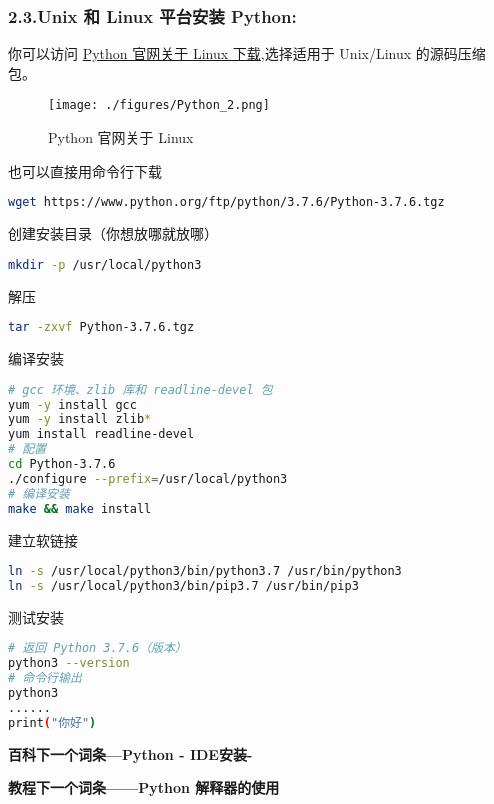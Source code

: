 \subsubsection{2.3.Unix 和 Linux 平台安装 Python:}
你可以访问 \href{https://www.python.org/downloads/source/}{Python 官网关于 Linux 下载},选择适用于 Unix/Linux 的源码压缩包。
\begin{figure}[ht]
\centering
\texttt{[image: ./figures/Python\_2.png]}
\caption{Python 官网关于 Linux} \label{Python_fig2}
\end{figure}

也可以直接用命令行下载
\begin{lstlisting}[language=bash]
wget https://www.python.org/ftp/python/3.7.6/Python-3.7.6.tgz
\end{lstlisting}

创建安装目录（你想放哪就放哪）
\begin{lstlisting}[language=bash]
mkdir -p /usr/local/python3
\end{lstlisting}

解压
\begin{lstlisting}[language=bash]
tar -zxvf Python-3.7.6.tgz
\end{lstlisting}

编译安装
\begin{lstlisting}[language=bash]
# gcc 环境、zlib 库和 readline-devel 包
yum -y install gcc
yum -y install zlib*
yum install readline-devel
# 配置
cd Python-3.7.6
./configure --prefix=/usr/local/python3
# 编译安装
make && make install
\end{lstlisting}

建立软链接
\begin{lstlisting}[language=bash]
ln -s /usr/local/python3/bin/python3.7 /usr/bin/python3
ln -s /usr/local/python3/bin/pip3.7 /usr/bin/pip3
\end{lstlisting}

测试安装
\begin{lstlisting}[language=bash]
# 返回 Python 3.7.6（版本）
python3 --version
# 命令行输出
python3
......
print("你好")
\end{lstlisting}

\textbf{百科下一个词条—Python - IDE安装-}

\textbf{教程下一个词条——Python 解释器的使用}
